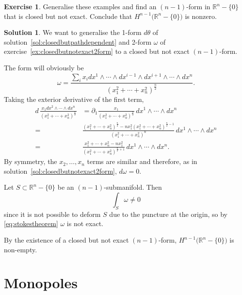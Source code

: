 \documentclass[11pt, a4paper]{report}
\theoremstyle{definition}
\newtheorem{ex}{Exercise}[part]
\newtheorem{sol}{Solution}[part]
\begin{document}
\begin{ex}

Generalise these examples and find an $(n-1)$-form in $\mathbb{R}^n - \{0\}$ that is closed but not exact.
Conclude that $H^{n - 1} \bigl( \mathbb{R}^{n} - \{0\} \bigr)$ is nonzero.

\end{ex}

\begin{sol}

We want to generalise the 1-form $d\theta$ of solution~\ref{sol:closedbutpathdependent} and 2-form $\omega$ of exercise~\ref{ex:closedbutnotexact2form} to a closed but not exact $(n-1)$-form.

The form will obviously be
\[
    \omega = \frac{\sum_i x_i dx^1 \wedge \cdots \wedge dx^{i - 1} \wedge dx^{i + 1} \wedge \cdots \wedge dx^n}
                  {{(x_1^2 + \cdots + x_n^2)}^\frac{n}{2}}.
\]
Taking the exterior derivative of the first term,
\begin{align*}
    d \, \frac{x_1 dx^2 \wedge \cdots \wedge dx^n}{{(x_1^2 + \cdots + x_n^2)}^\frac{n}{2}}
        &= \partial_1 \frac{x_1}{{(x_1^2 + \cdots + x_n^2)}^\frac{n}{2}} \, dx^1 \wedge \cdots \wedge dx^n \\
        ={}& \frac{{(x_1^2 + \cdots + x_n^2)}^\frac{n}{2} - n x_1^2 {(x_1^2 + \cdots + x_n^2)}^{\frac{n}{2} - 1}}
                  {{(x_1^2 + \cdots + x_n^2)}^n} \, dx^1 \wedge \cdots \wedge dx^n \\
        ={}& \frac{x_1^2 + \cdots + x_n^2 - n x_1^2}
                  {{(x_1^2 + \cdots + x_n^2)}^{\frac{n}{2} + 1}} \, dx^1 \wedge \cdots \wedge dx^n.
\end{align*}
By symmetry, the $x_2, \ldots, x_n$ terms are similar and therefore, as in solution~\ref{sol:closedbutnotexact2form}, $d\omega = 0$.

Let $S \subset \mathbb{R}^n - \{0\}$ be an $(n - 1)$-submanifold. Then
\[
    \int_S \omega \neq 0
\]
since it is not possible to deform $S$ due to the puncture at the origin, so by \ref{eq:stokestheorem} $\omega$ is not exact. %

By the existence of a closed but not exact $(n - 1)$-form, $H^{n - 1} \bigl( \mathbb{R}^n - \{0\} \bigr)$ is non-empty.

\end{sol}

\section{Monopoles}
\end{document}
